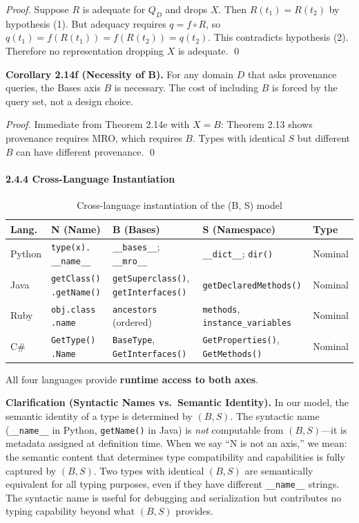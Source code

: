\emph{Proof.} Suppose $R$ is adequate for $Q_D$ and drops $X$. Then $R(t_1) = R(t_2)$ by hypothesis (1). But adequacy requires $q = f \circ R$, so $q(t_1) = f(R(t_1)) = f(R(t_2)) = q(t_2)$. This contradicts hypothesis (2). Therefore no representation dropping $X$ is adequate. \qed

\textbf{Corollary 2.14f (Necessity of B).} For any domain $D$ that asks provenance queries, the Bases axis $B$ is necessary. The cost of including $B$ is forced by the query set, not a design choice.

\emph{Proof.} Immediate from Theorem 2.14e with $X = B$: Theorem 2.13 shows provenance requires MRO, which requires $B$. Types with identical $S$ but different $B$ can have different provenance. \qed

\paragraph{2.4.4 Cross-Language Instantiation}\label{cross-language-instantiation}

\begin{table}[h]
\caption{Cross-language instantiation of the (B, S) model}
\label{tab:nbs-cross}
\footnotesize
\setlength{\tabcolsep}{4pt}
\begin{tabular}{@{}p{1.1cm}p{2.6cm}p{3.2cm}p{3.2cm}p{1.2cm}@{}}
\toprule
Lang. & N (Name) & B (Bases) & S (Namespace) & Type \\
\midrule
Python & \texttt{type(x).} \texttt{\_\_name\_\_} & \texttt{\_\_bases\_\_}; \texttt{\_\_mro\_\_} & \texttt{\_\_dict\_\_}; \texttt{dir()} & Nominal \\
Java   & \texttt{getClass()} \texttt{.getName()} & \texttt{getSuperclass()}, \texttt{getInterfaces()} & \texttt{getDecl\-ared\-Methods()} & Nominal \\
Ruby   & \texttt{obj.class} \texttt{.name} & \texttt{ancestors} (ordered) & \texttt{methods}, \texttt{instance\_variables} & Nominal \\
C\#    & \texttt{GetType()} \texttt{.Name} & \texttt{BaseType}, \texttt{GetInterfaces()} & \texttt{GetProperties()}, \texttt{GetMethods()} & Nominal \\
\bottomrule
\end{tabular}
\end{table}

All four languages provide \textbf{runtime access to both axes}.

\textbf{Clarification (Syntactic Names vs.\ Semantic Identity).} In our model, the semantic identity of a type is determined by $(B, S)$. The syntactic name (\texttt{\_\_name\_\_} in Python, \texttt{getName()} in Java) is \emph{not} computable from $(B, S)$---it is metadata assigned at definition time. When we say ``N is not an axis,'' we mean: the semantic content that determines type compatibility and capabilities is fully captured by $(B, S)$. Two types with identical $(B, S)$ are semantically equivalent for all typing purposes, even if they have different \texttt{\_\_name\_\_} strings. The syntactic name is useful for debugging and serialization but contributes no typing capability beyond what $(B, S)$ provides.

